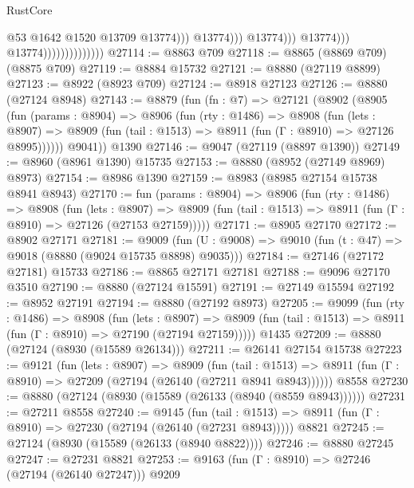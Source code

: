 \begin{lexlean}{RustCore}
\begin{coremodule}
                                                        @53
                                                        @1642
                                                        @1520
                                                        @13709
                                                        @13774)))
                                                  @13774)))
                                            @13774)))
                                      @13774)))
                                @13774))))))))))))))
@27114 := @8863 @709
@27118 := @8865 (@8869 @709) (@8875 @709)
@27119 := @8884 @15732
@27121 := @8880 (@27119 @8899)
@27123 := @8922 (@8923 @709)
@27124 := @8918 @27123
@27126 := @8880 (@27124 @8948)
@27143 := @8879
    (fun (fn : @7) =>
    @27121
      (@8902
        (@8905
          (fun (params : @8904) =>
          @8906
            (fun (rty : @1486) =>
            @8908
              (fun (lets : @8907) =>
              @8909 (fun (tail : @1513) => @8911 (fun (Γ : @8910) => @27126 @8995))))))
        @9041))
    @1390
@27146 := @9047 (@27119 (@8897 @1390))
@27149 := @8960 (@8961 @1390) @15735
@27153 := @8880 (@8952 (@27149 @8969) @8973)
@27154 := @8986 @1390
@27159 := @8983 (@8985 @27154 @15738 @8941 @8943)
@27170 := fun (params : @8904) =>
  @8906
    (fun (rty : @1486) =>
    @8908
      (fun (lets : @8907) =>
      @8909 (fun (tail : @1513) => @8911 (fun (Γ : @8910) => @27126 (@27153 @27159)))))
@27171 := @8905 @27170
@27172 := @8902 @27171
@27181 := @9009
    (fun (U : @9008) => @9010 (fun (t : @47) => @9018 (@8880 (@9024 @15735 @8898) @9035)))
@27184 := @27146 (@27172 @27181) @15733
@27186 := @8865 @27171 @27181
@27188 := @9096 @27170 @3510
@27190 := @8880 (@27124 @15591)
@27191 := @27149 @15594
@27192 := @8952 @27191
@27194 := @8880 (@27192 @8973)
@27205 := @9099
    (fun (rty : @1486) =>
    @8908
      (fun (lets : @8907) =>
      @8909 (fun (tail : @1513) => @8911 (fun (Γ : @8910) => @27190 (@27194 @27159)))))
    @1435
@27209 := @8880 (@27124 (@8930 (@15589 @26134)))
@27211 := @26141 @27154 @15738
@27223 := @9121
    (fun (lets : @8907) =>
    @8909
      (fun (tail : @1513) =>
      @8911 (fun (Γ : @8910) => @27209 (@27194 (@26140 (@27211 @8941 @8943))))))
    @8558
@27230 := @8880 (@27124 (@8930 (@15589 (@26133 (@8940 (@8559 @8943))))))
@27231 := @27211 @8558
@27240 := @9145
    (fun (tail : @1513) => @8911 (fun (Γ : @8910) => @27230 (@27194 (@26140 (@27231 @8943)))))
    @8821
@27245 := @27124 (@8930 (@15589 (@26133 (@8940 @8822))))
@27246 := @8880 @27245
@27247 := @27231 @8821
@27253 := @9163 (fun (Γ : @8910) => @27246 (@27194 (@26140 @27247))) @9209

\end{coremodule}
\end{lexlean}
